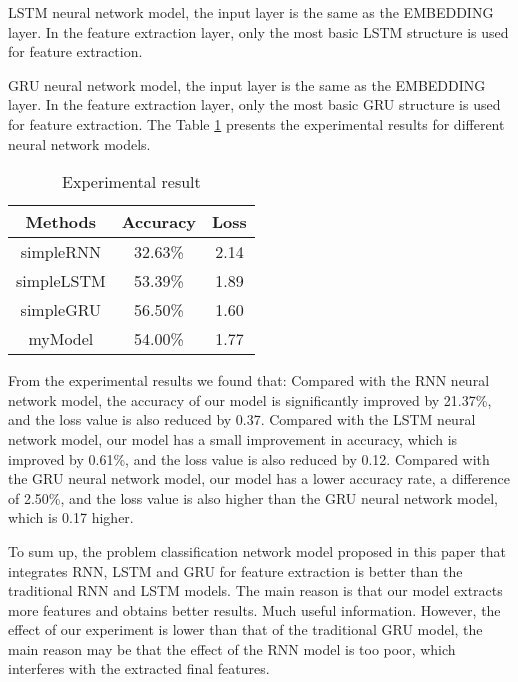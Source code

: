 \documentclass{article}
\begin{document}
LSTM neural network model, the input layer is the same as the EMBEDDING layer. In the feature extraction layer, only the most basic LSTM structure is used for feature extraction.

GRU neural network model, the input layer is the same as the EMBEDDING layer. In the feature extraction layer, only the most basic GRU structure is used for feature extraction.
The Table \ref{tab:3} presents the experimental results for different neural network models.
\begin{table}[h!]
    \caption{Experimental result}    
    \centering
    \begin{tabular}{ccc}
            \hline
            Methods    & Accuracy & Loss \\ \hline
            simpleRNN  & 32.63\%  & 2.14\\
            simpleLSTM & 53.39\%  & 1.89\\
            simpleGRU  & 56.50\%  & 1.60\\
            myModel    & 54.00\%  & 1.77\\
            \end{tabular}
    \label{tab:3}
\end{table}
From the experimental results we found that:
Compared with the RNN neural network model, the accuracy of our model is significantly improved by 21.37\%, and the loss value is also reduced by 0.37.
Compared with the LSTM neural network model, our model has a small improvement in accuracy, which is improved by 0.61\%, and the loss value is also reduced by 0.12.
Compared with the GRU neural network model, our model has a lower accuracy rate, a difference of 2.50\%, and the loss value is also higher than the GRU neural network model, which is 0.17 higher.

To sum up, the problem classification network model proposed in this paper that integrates RNN, LSTM and GRU for feature extraction is better than the traditional RNN and LSTM models. The main reason is that our model extracts more features and obtains better results. Much useful information. However, the effect of our experiment is lower than that of the traditional GRU model, the main reason may be that the effect of the RNN model is too poor, which interferes with the extracted final features.
\end{document}
